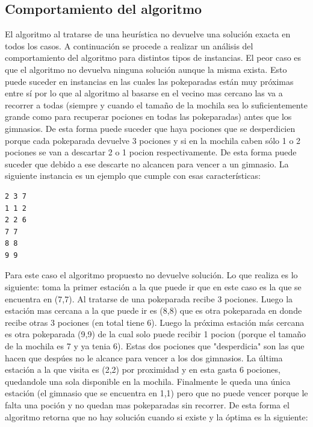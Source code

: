       \subsection{Comportamiento del algoritmo}
      El algoritmo al tratarse de una heurística no devuelve una solución exacta en todos los casos. A continuación se procede a realizar un análisis del comportamiento del algoritmo para distintos tipos de instancias. El peor caso es que el algoritmo no devuelva ninguna solución aunque la misma exista. Esto puede suceder en instancias en las cuales las pokeparadas están muy próximas entre sí por lo que al algoritmo al basarse en el vecino mas cercano las va a recorrer a todas (siempre y cuando el tamaño de la mochila sea lo suficientemente grande como para recuperar pociones en todas las pokeparadas) antes que los gimnasios. De esta forma puede suceder que haya pociones que se desperdicien porque cada pokeparada devuelve 3 pociones y si en la mochila caben sólo 1 o 2 pociones se van a descartar 2 o 1 pocion respectivamente. De esta forma puede suceder que debido a ese descarte no alcancen para vencer a un gimnasio. La siguiente instancia es un ejemplo que cumple con esas características: 

      \begin{codesnippet}
            \begin{verbatim}
2 3 7
1 1 2
2 2 6
7 7
8 8
9 9

\end{verbatim}
            \end{codesnippet}


      Para este caso el algoritmo propuesto no devuelve solución. Lo que realiza es lo siguiente: toma la primer estación a la que puede ir que en este caso es la que se encuentra en (7,7). Al tratarse de una pokeparada recibe 3 pociones. Luego la estación mas cercana a la que puede ir es (8,8) que es otra pokeparada en donde recibe otras 3 pociones (en total tiene 6). Luego la próxima estación más cercana es otra pokeparada (9,9) de la cual solo puede recibir 1 pocion (porque el tamaño de la mochila es 7 y ya tenia 6). Estas dos pociones que "desperdicia" son las que hacen que despúes no le alcance para vencer a los dos gimnasios. La última estación a la que visita es (2,2) por proximidad y en esta gasta 6 pociones, quedandole una sola disponible en la mochila. Finalmente le queda una única estación (el gimnasio que se encuentra en 1,1) pero que no puede vencer porque le falta una poción y no quedan mas pokeparadas sin recorrer. De esta forma el algoritmo retorna que no hay solución cuando si existe y la óptima es la siguiente: 

